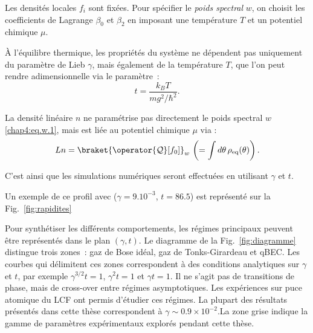 Les densités locales $f_i$ sont fixées. Pour spécifier le {\em poids spectral} $w$, on choisit les coefficients de Lagrange $\beta_0$ et $\beta_2$ en imposant une température \(T\) et un potentiel chimique \(\mu\).

\medskip

À l’équilibre thermique, les propriétés du système ne dépendent pas uniquement du paramètre de Lieb $\gamma$, mais également de la température $T$, que l’on peut rendre adimensionnelle via le paramètre :
\begin{equation}\label{chap2:eq:t.1}
t = \frac{k_B T}{mg^2/\hbar^2}.
\end{equation}



La densité linéaire \( n \) ne paramétrise pas directement le poids spectral $w$ \eqref{chap4:eq.w.1}, mais est liée au potentiel chimique \(\mu\) via :
\begin{equation}\label{chap2:eq:n.1}
	L n = \braket{\operator{\mathcal{Q}}[f_0]}_w \, \left ( = \int d\theta  \, \rho_{\mathrm{eq}}(\theta)  \right)  .
\end{equation}

C’est ainsi que les simulations numériques seront effectuées en utilisant $\gamma$ et $t$.


\medskip

Un exemple de ce profil  avec ($\gamma=9.10^{-3}$, $t = 86.5$) est représenté sur la Fig.~\ref{fig:rapidites}

\medskip


Pour synthétiser les différents comportements, les régimes principaux peuvent être représentés dans le plan $(\gamma, t)$. Le diagramme de la Fig.~\ref{fig:diagramme} distingue trois zones : gaz de Bose idéal, gaz de Tonks-Girardeau et qBEC. Les courbes qui délimitent ces zones correspondent à des conditions analytiques sur $\gamma$ et $t$, par exemple $\gamma^{3/2} t = 1$, $\gamma^2 t = 1$ et $\gamma t = 1$. Il ne s’agit pas de transitions de phase, mais de cross-over entre régimes asymptotiques. Les expériences sur puce atomique du LCF ont permis d’étudier ces régimes. La plupart des résultats présentés dans cette thèse correspondent à $\gamma \sim 0.9 \times 10^{-2}$.La zone grise indique la gamme de paramètres expérimentaux explorés pendant cette thèse.

